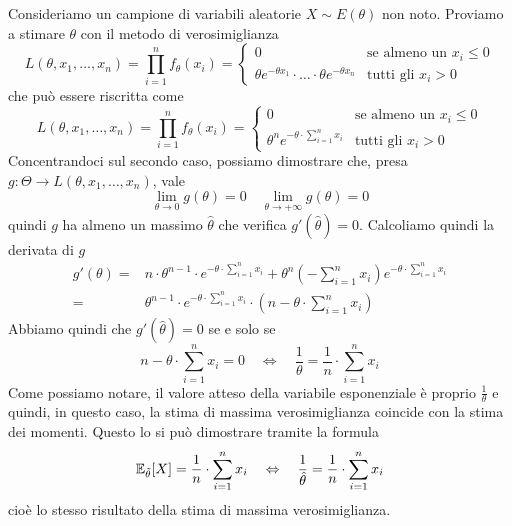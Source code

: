 \begin{example}
	Consideriamo un campione di variabili aleatorie $X \sim E(\theta)$ non noto. Proviamo a stimare
	$\theta$ con il metodo di verosimiglianza
	\[
		L(\theta, x_1, \dots, x_n) =
		\prod_{i=1}^n f_\theta(x_i) =
		\begin{cases}
			0                                                                &
			\text{se almeno un } x_i \leq 0                                    \\
			\theta e^{-\theta x_1} \cdot \ldots \cdot \theta e^{-\theta x_n} &
			\text{tutti gli } x_i > 0
		\end{cases}
	\]
	che può essere riscritta come
	\[
		L(\theta, x_1, \dots, x_n) =
		\prod_{i=1}^n f_\theta(x_i) =
		\begin{cases}
			0                                             &
			\text{se almeno un } x_i \leq 0                 \\
			\theta^n e^{-\theta \cdot \sum_{i=1}^{n} x_i} &
			\text{tutti gli } x_i > 0
		\end{cases}
	\]
	Concentrandoci sul secondo caso, possiamo dimostrare che, presa
	$g : \Theta \to L(\theta, x_1, \dots, x_n)$, vale
	\[ \lim_{\theta \to 0} g(\theta) = 0 \quad \lim_{\theta \to +\infty} g(\theta) = 0 \]
	quindi $g$ ha almeno un massimo $\hat{\theta}$ che verifica $g'(\hat{\theta}) = 0$. Calcoliamo
	quindi la derivata di $g$
	\begin{align*}
		g'(\theta) = & n \cdot \theta^{n-1} \cdot e^{-\theta \cdot \sum_{i=1}^n x_i} +
		\theta^n \left( -\sum_{i=1}^{n} x_i \right) e^{-\theta \cdot \sum_{i=1}^{n} x_i} \\
		=            & \theta^{n-1} \cdot e^{-\theta \cdot \sum_{i=1}^{n} x_i} \cdot
		\left(n - \theta \cdot \sum_{i=1}^{n} x_i \right)
	\end{align*}
	Abbiamo quindi che $g'(\hat{\theta}) = 0$ se e solo se
	\[
		n - \theta \cdot \sum_{i=1}^{n} x_i = 0
		\quad \Leftrightarrow \quad
		\frac{1}{\theta} = \frac{1}{n} \cdot \sum_{i=1}^{n} x_i
	\]
	Come possiamo notare, il valore atteso della variabile esponenziale è proprio
	$\frac{1}{\theta}$ e quindi, in questo caso, la stima di massima verosimiglianza coincide con
	la stima dei momenti. Questo lo si può dimostrare tramite la formula
	\[
		\mathbb{E}_{\tilde{\theta}} [X] = \frac{1}{n} \cdot \sum_{i=1}^n x_i
		\quad \Leftrightarrow \quad
		\frac{1}{\hat{\theta}} = \frac{1}{n} \cdot \sum_{i=1}^n x_i
	\]
	cioè lo stesso risultato della stima di massima verosimiglianza.
\end{example}

